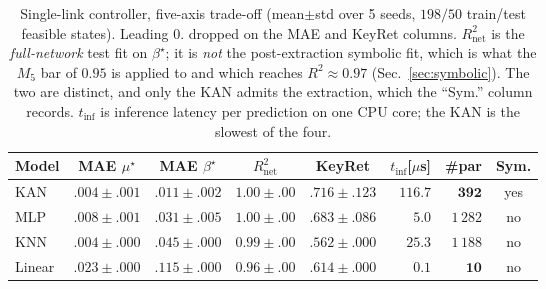\begin{table}[!htbp]
\renewcommand{\arraystretch}{1.15}
\caption{Single-link controller, five-axis trade-off (mean$\pm$std over 5 seeds, $198/50$ train/test feasible states). Leading $0.$ dropped on the MAE and KeyRet columns. $R^2_{\text{net}}$ is the \emph{full-network} test fit on $\beta^\star$; it is \emph{not} the post-extraction symbolic fit, which is what the $M_5$ bar of $0.95$ is applied to and which reaches $R^2\approx0.97$ (Sec.~\ref{sec:symbolic}). The two are distinct, and only the KAN admits the extraction, which the ``Sym.'' column records. $t_{\text{inf}}$ is inference latency per prediction on one CPU core; the KAN is the slowest of the four.}
\label{tab:singlelink}
\centering
\footnotesize
\setlength{\tabcolsep}{3pt}
\begin{tabular}{@{}l c c c c r r c@{}}
\toprule
Model & MAE $\mu^\star$ & MAE $\beta^\star$ & $R^2_{\text{net}}$ & KeyRet & $t_{\text{inf}}$[$\mu$s] & \#par & Sym.\\
\midrule
KAN     & $.004{\pm}.001$ & $.011{\pm}.002$ & $1.00{\pm}.00$ & $\mathbf{.716{\pm}.123}$ & $116.7$ & $\mathbf{392}$ & yes\\
MLP     & $.008{\pm}.001$ & $.031{\pm}.005$ & $1.00{\pm}.00$ & $.683{\pm}.086$ & $\mathbf{5.0}$ & $1\,282$ & no\\
KNN     & $.004{\pm}.000$ & $.045{\pm}.000$ & $0.99{\pm}.00$ & $.562{\pm}.000$ & $25.3$ & $1\,188$ & no\\
Linear  & $.023{\pm}.000$ & $.115{\pm}.000$ & $0.96{\pm}.00$ & $.614{\pm}.000$ & $\mathbf{0.1}$ & $\mathbf{10}$ & no\\
\bottomrule
\end{tabular}
\end{table}


